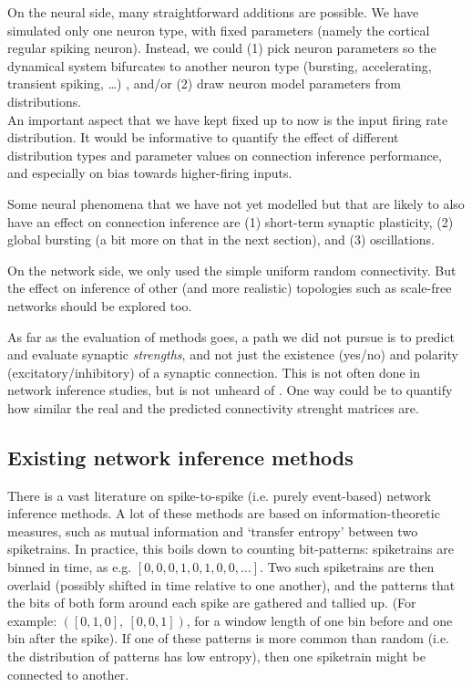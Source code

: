 On the neural side, many straightforward additions are possible. We have simulated only one neuron type, with fixed parameters (namely the cortical regular spiking neuron). Instead, we could (1) pick neuron parameters so the dynamical system bifurcates to another neuron type (bursting, accelerating, transient spiking, …) \cite{Naud2008FiringPatternsAdaptive}, and/or (2) draw neuron model parameters from distributions.\\
An important aspect that we have kept fixed up to now is the input firing rate distribution. It would be informative to quantify the effect of different distribution types and parameter values on connection inference performance, and especially on bias towards higher-firing inputs.

Some neural phenomena that we have not yet modelled but that are likely to also have an effect on connection inference are (1) short-term synaptic plasticity, (2) global bursting (a bit more on that in the next section), and (3) oscillations.

On the network side, we only used the simple uniform random connectivity. But the effect on inference of other (and more realistic) topologies such as scale-free networks should be explored too.

As far as the evaluation of methods goes, a path we did not pursue is to predict and evaluate synaptic \emph{strengths}, and not just the existence (yes/no) and polarity (excitatory/inhibitory) of a synaptic connection. This is not often done in network inference studies, but is not unheard of \cite{Zhang2017SpikeTriggeredRegressionSynaptic}.
One way could be to quantify how similar the real and the predicted connectivity strenght matrices are.


\subsection{Existing network inference methods}

There is a vast literature on spike-to-spike (i.e. purely event-based) network inference methods. A lot of these methods are based on information-theoretic measures, such as mutual information and `transfer entropy' between two spiketrains. In practice, this boils down to counting bit-patterns: spiketrains are binned in time, as e.g. $[0, 0, 0, 1, 0, 1, 0, 0, …]$. Two such spiketrains are then overlaid (possibly shifted in time relative to one another), and the patterns that the bits of both form around each spike are gathered and tallied up. (For example: $([0,1,0],\ [0,0,1])$, for a window length of one bin before and one bin after the spike). If one of these patterns is more common than random (i.e. the distribution of patterns has low entropy), then one spiketrain might be connected to another.

